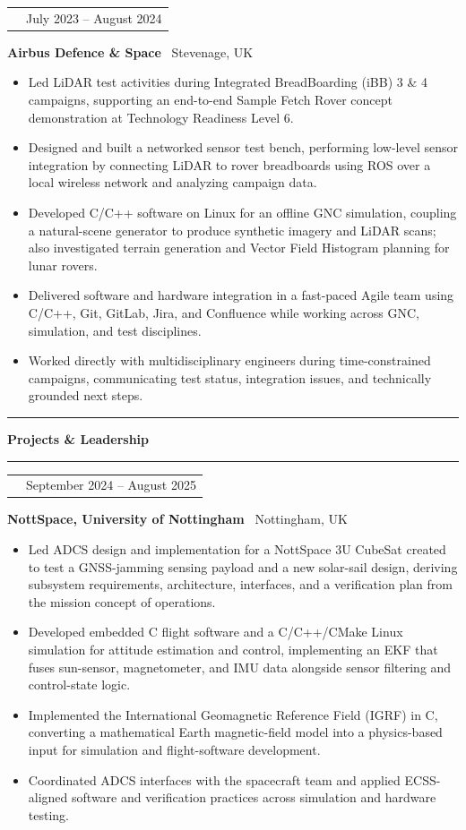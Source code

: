 \documentclass[10pt,a4paper]{article}
\makeatletter
\newcommand{\SectionSize}{11.5pt}
\newcommand{\RoleSize}{10.3pt}
\newcommand{\CompanySize}{9.6pt}
\newcommand{\DurationSize}{9pt}
\newcommand{\BodySize}{9.2pt}
\newcommand{\SectionLineSize}{12pt}
\newcommand{\RoleLineSize}{11.5pt}
\newcommand{\CompanyLineSize}{10.8pt}
\newcommand{\DurationLineSize}{9pt}
\newcommand{\BodyLineSize}{11pt}
\newcommand{\SectionBefore}{4pt}
\newcommand{\SectionLineToTitle}{0pt}
\newcommand{\SectionTitleToLine}{2pt}
\newcommand{\SectionLineToEntry}{0pt}
\newcommand{\EntryBefore}{0pt}
\newcommand{\RoleToCompany}{-5pt}
\newcommand{\CompanyToBullets}{3pt}
\newcommand{\EntryAfter}{6pt}
\newcommand{\BulletSpacing}{2pt}
\newcommand{\BulletBefore}{0pt}
\newcommand{\BulletIndent}{1.25em}
\newcommand{\SectionLineThickness}{1.5pt}
\newcommand{\SubsectionLineThickness}{0.4pt}
\newcommand{\DurationWidth}{4.5cm}
\newcommand{\CVSection}[1]{

    \vspace{\SectionBefore}


    \noindent
    \textcolor{CVBlack}{
        \rule{\textwidth}{\SectionLineThickness}
    }

    \vspace{\SectionLineToTitle}


    {\fontsize{\SectionSize}{\SectionLineSize}
    \selectfont
    \textbf{\textcolor{CVBlack}{#1}}}

    \vspace{\SectionTitleToLine}


    \noindent
    \textcolor{CVLightGray}{
        \rule{\textwidth}{\SubsectionLineThickness}
    }

    \vspace{\SectionLineToEntry}
}
\newcommand{\CVEntry}[5]{

    \vspace{\EntryBefore}


    \noindent
    \begin{tabularx}{\textwidth}{
        @{}
        >{\raggedright\arraybackslash}X
        >{\raggedleft\arraybackslash}p{\DurationWidth}
        @{}
    }

        {\fontsize{\RoleSize}{\RoleLineSize}
        \selectfont
        \textbf{\textcolor{CVBlack}{#1}}}
        &
        {\fontsize{\DurationSize}{\DurationLineSize}
        \selectfont
        \textcolor{CVGray}{#4}}

    \end{tabularx}

    \vspace{\RoleToCompany}


    \noindent
    {\fontsize{\CompanySize}{\CompanyLineSize}
    \selectfont
    \textbf{\textcolor{CVDarkGray}{#2}}
    \textcolor{CVGray}{\textbar\ #3}}

    \vspace{\CompanyToBullets}


    \begin{itemize}[
        leftmargin=\BulletIndent,
        itemsep=\BulletSpacing,
        topsep=\BulletBefore,
        parsep=0pt,
        partopsep=0pt
    ]
        #5
    \end{itemize}

    \vspace{\EntryAfter}
}
\newcommand{\CVBullet}[1]{
    \item
    {\fontsize{\BodySize}{\BodyLineSize}
    \selectfont
    \textcolor{CVDarkGray}{#1}}
}
\makeatother
\begin{document}
\CVEntry
{AOCS/GNC Engineer Intern}
{Airbus Defence \& Space}
{Stevenage, UK}
{July 2023 -- August 2024}
{
    \CVBullet{Led LiDAR test activities during Integrated BreadBoarding (iBB) 3 \& 4 campaigns, supporting an end-to-end Sample Fetch Rover concept demonstration at Technology Readiness Level 6.}

    \CVBullet{Designed and built a networked sensor test bench, performing low-level sensor integration by connecting LiDAR to rover breadboards using ROS over a local wireless network and analyzing campaign data.}

    \CVBullet{Developed C/C++ software on Linux for an offline GNC simulation, coupling a natural-scene generator to produce synthetic imagery and LiDAR scans; also investigated terrain generation and Vector Field Histogram planning for lunar rovers.}

    \CVBullet{Delivered software and hardware integration in a fast-paced Agile team using C/C++, Git, GitLab, Jira, and Confluence while working across GNC, simulation, and test disciplines.}

    \CVBullet{Worked directly with multidisciplinary engineers during time-constrained campaigns, communicating test status, integration issues, and technically grounded next steps.}
}


\CVSection{Projects \& Leadership}

\CVEntry
{JamSail 3U CubeSat -- AOCS/ADCS Lead}
{NottSpace, University of Nottingham}
{Nottingham, UK}
{September 2024 -- August 2025}
{
    \CVBullet{Led ADCS design and implementation for a NottSpace 3U CubeSat created to test a GNSS-jamming sensing payload and a new solar-sail design, deriving subsystem requirements, architecture, interfaces, and a verification plan from the mission concept of operations.}

    \CVBullet{Developed embedded C flight software and a C/C++/CMake Linux simulation for attitude estimation and control, implementing an EKF that fuses sun-sensor, magnetometer, and IMU data alongside sensor filtering and control-state logic.}

    \CVBullet{Implemented the International Geomagnetic Reference Field (IGRF) in C, converting a mathematical Earth magnetic-field model into a physics-based input for simulation and flight-software development.}

    \CVBullet{Coordinated ADCS interfaces with the spacecraft team and applied ECSS-aligned software and verification practices across simulation and hardware testing.}
}
\end{document}

